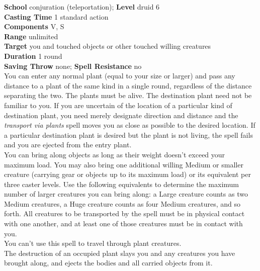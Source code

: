 \textbf{School} conjuration (teleportation); \textbf{Level} druid 6\\
\textbf{Casting Time} 1 standard action\\
\textbf{Components} V, S\\
\textbf{Range} unlimited\\
\textbf{Target} you and touched objects or other touched willing creatures\\
\textbf{Duration} 1 round\\
\textbf{Saving Throw} none; \textbf{Spell Resistance} no\\
You can enter any normal plant (equal to your size or larger) and pass any distance to a plant of the same kind in a single round, regardless of the distance separating the two. The plants must be alive. The destination plant need not be familiar to you. If you are uncertain of the location of a particular kind of destination plant, you need merely designate direction and distance and the \textit{transport via plants }spell moves you as close as possible to the desired location. If a particular destination plant is desired but the plant is not living, the spell fails and you are ejected from the entry plant.\\
You can bring along objects as long as their weight doesn't exceed your maximum load. You may also bring one additional willing Medium or smaller creature (carrying gear or objects up to its maximum load) or its equivalent per three caster levels. Use the following equivalents to determine the maximum number of larger creatures you can bring along: a Large creature counts as two Medium creatures, a Huge creature counts as four Medium creatures, and so forth. All creatures to be transported by the spell must be in physical contact with one another, and at least one of those creatures must be in contact with you.\\
You can't use this spell to travel through plant creatures.\\
The destruction of an occupied plant slays you and any creatures you have brought along, and ejects the bodies and all carried objects from it.\\
